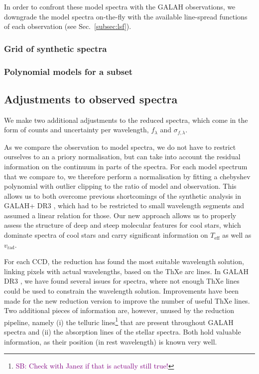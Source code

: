 \documentclass[
  journal=pasa,
  manuscript=research-paper, %
  year=2021,
  volume=37,
]{cup-journal}
\newcommand{\SB}[1]{{\textcolor{purple}{SB: #1}}}
\newcommand{\Teff}{$T_\mathrm{eff}$\xspace}
\newcommand{\vrad}{$v_\mathrm{rad}$\xspace}
\begin{document}
In order to confront these model spectra with the GALAH observations, we downgrade the model spectra on-the-fly with the available line-spread functions of each observation (see Sec.~\ref{subsec:lsf}).

\subsubsection{Grid of synthetic spectra}

\subsubsection{Polynomial models for a subset}

\subsection{Adjustments to observed spectra} \label{subsec:adjustments_observation}

We make two additional adjustments to the reduced spectra, which come in the form of counts and uncertainty per wavelength, $f_\lambda$ and $\sigma_{f,\lambda}$.

As we compare the observation to model spectra, we do not have to restrict ourselves to an a priory normalisation, but can take into account the residual information on the continuum in parts of the spectra. For each model spectrum that we compare to, we therefore perform a normalisation by fitting a chebyshev polynomial with outlier clipping to the ratio of model and observation. This allows us to both overcome previous shortcomings of the synthetic analysis in GALAH+ DR3 \citep{Buder2021}, which had to be restricted to small wavelength segments and assumed a linear relation for those. Our new approach allows us to properly assess the structure of deep and steep molecular features for cool stars, which dominate spectra of cool stars and carry significant information on \Teff as well as \vrad.

For each CCD, the reduction has found the most suitable wavelength solution, linking pixels with actual wavelengths, based on the ThXe arc lines. In GALAH DR3 \citep{Buder2021}, we have found several issues for spectra, where not enough ThXe lines could be used to constrain the wavelength solution. Improvements have been made for the new reduction version to improve the number of useful ThXe lines. Two additional pieces of information are, however, unused by the reduction pipeline, namely (i) the telluric lines\footnote{\SB{Check with Janez if that is actually still true!}} that are present throughout GALAH spectra and (ii) the absorption lines of the stellar spectra. Both hold valuable information, as their position (in rest wavelength) is known very well.
\end{document}
